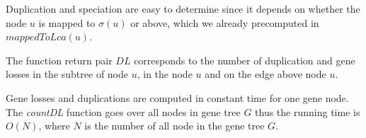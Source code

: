 Duplication and speciation are easy to determine since it depends on whether the node $u$ is mapped to $\sigma(u)$ or above, which we already precomputed in $mappedToLca(u)$.

The function return pair $DL$ corresponds to the number of duplication and gene losses in the subtree of node $u$, in the node $u$ and on the edge above node $u$.

Gene losses and duplications are computed in constant time for one gene node. The \emph{countDL} function goes over all nodes in gene tree $G$ thus the running time is $O(N)$, where $N$ is the number of all node in the gene tree $G$.


